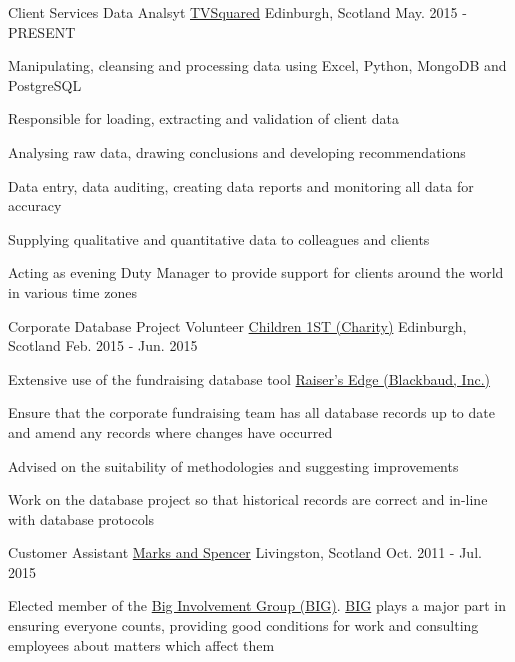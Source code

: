 \begin{cventries}
  \cventry
    {Client Services Data Analsyt}
    {\href{http://tvsquared.com/}{TVSquared}}
    {Edinburgh, Scotland}
    {May. 2015 - PRESENT}
    {
      \begin{cvitems}
        \item {Manipulating, cleansing and processing data using Excel, Python, MongoDB and PostgreSQL}
        \item {Responsible for loading, extracting and validation of client data}
        \item {Analysing raw data, drawing conclusions and developing recommendations}
        \item {Data entry, data auditing, creating data reports and monitoring all data for accuracy}
        \item {Supplying qualitative and quantitative data to colleagues and clients}
        \item {Acting as evening Duty Manager to provide support for clients around the world in various time zones}
      \end{cvitems}
    }
  \cventry
    {Corporate Database Project Volunteer}
    {\href{http://www.children1st.org.uk/}{Children 1ST (Charity)}}
    {Edinburgh, Scotland}
    {Feb. 2015 - Jun. 2015}
    {
      \begin{cvitems}
        \item {Extensive use of the fundraising database tool \href{https://www.blackbaud.com/fundraising-and-relationship-management/raisers-edge}{Raiser's Edge (Blackbaud, Inc.)}}
        \item {Ensure that the corporate fundraising team has all database records up to date and amend any records where changes have occurred}
        \item {Advised on the suitability of methodologies and suggesting improvements}
        \item {Work on the database project so that historical records are correct and in-line with database protocols}
      \end{cvitems} 
    }
  \cventry
    {Customer Assistant}
    {\href{http://www.marksandspencer.com/}{Marks and Spencer}}
    {Livingston, Scotland}
    {Oct. 2011 - Jul. 2015}
    {
      \begin{cvitems}
        \item {Elected member of the \href{https://corporate.marksandspencer.com/documents/policy-documents/people-principles-.pdf}{Big Involvement Group (BIG)}. \href{https://corporate.marksandspencer.com/documents/policy-documents/people-principles-.pdf}{BIG} plays a major part in ensuring everyone counts, providing good conditions for work and consulting employees about matters which affect them}

\end{cvitems}}
\end{cventries}
